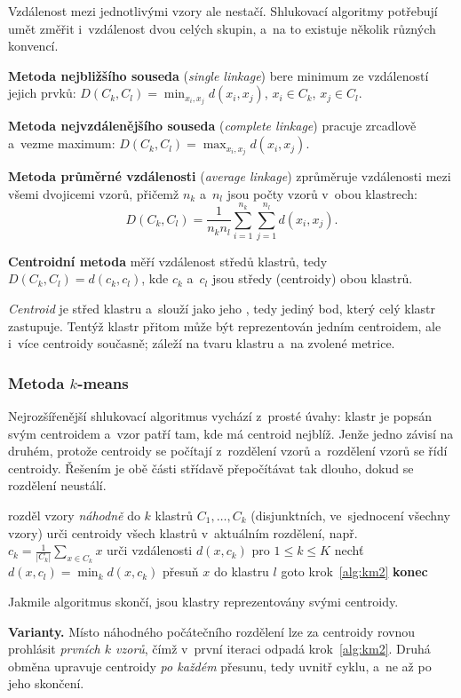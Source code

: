 \documentclass[11pt,a4paper]{article}
\theoremstyle{definition}
\begin{document}
Vzdálenost mezi jednotlivými vzory ale nestačí. Shlukovací algoritmy potřebují umět změřit
i~vzdálenost dvou celých skupin, a~na to existuje několik různých konvencí.

\begin{defbox}
\textbf{Metoda nejbližšího souseda} (\emph{single linkage}) bere minimum ze vzdáleností
jejich prvků:
$D(C_k,C_l)=\min_{x_i,x_j} d(x_i,x_j)$, $x_i\in C_k$, $x_j\in C_l$.

\textbf{Metoda nejvzdálenějšího souseda} (\emph{complete linkage}) pracuje zrcadlově
a~vezme maximum:
$D(C_k,C_l)=\max_{x_i,x_j} d(x_i,x_j)$.

\textbf{Metoda průměrné vzdálenosti} (\emph{average linkage}) zprůměruje vzdálenosti mezi
všemi dvojicemi vzorů, přičemž $n_k$ a~$n_l$ jsou počty vzorů v~obou klastrech:
\[ D(C_k,C_l)=\frac{1}{n_kn_l}\sum_{i=1}^{n_k}\sum_{j=1}^{n_l} d(x_i,x_j). \]

\textbf{Centroidní metoda} měří vzdálenost středů klastrů, tedy $D(C_k,C_l)=d(c_k,c_l)$, kde
$c_k$ a~$c_l$ jsou středy (centroidy) obou klastrů.
\end{defbox}

\emph{Centroid} je střed klastru a~slouží jako jeho , tedy jediný bod, který celý
klastr zastupuje. Tentýž klastr přitom může být reprezentován jedním centroidem, ale i~více
centroidy současně; záleží na tvaru klastru a~na zvolené metrice.

\subsubsection{Metoda $k$-means}

Nejrozšířenější shlukovací algoritmus vychází z~prosté úvahy: klastr je popsán svým
centroidem a~vzor patří tam, kde má centroid nejblíž. Jenže jedno závisí na druhém, protože
centroidy se počítají z~rozdělení vzorů a~rozdělení vzorů se řídí centroidy. Řešením je obě
části střídavě přepočítávat tak dlouho, dokud se rozdělení neustálí.

\begin{defbox}
\begin{algorithmic}[1]
\State rozděl vzory \emph{náhodně} do $k$ klastrů $C_1,\dots,C_k$ (disjunktních, ve~sjednocení
       všechny vzory)
\State \label{alg:km2} urči centroidy všech klastrů v~aktuálním rozdělení,
       např.\ $c_k=\frac{1}{|C_k|}\sum_{x\in C_k}x$
   \State urči vzdálenosti $d(x,c_k)$ pro $1\le k\le K$
   \State nechť $d(x,c_l)=\min_k d(x,c_k)$
    \State přesuň $x$ do klastru $l$ \EndIf
\EndFor
{} \State goto krok~\ref{alg:km2} \Else \State \textbf{konec} \EndIf
\end{algorithmic}
Jakmile algoritmus skončí, jsou klastry reprezentovány svými centroidy.

\textbf{Varianty.} Místo náhodného počátečního rozdělení lze za centroidy rovnou prohlásit
\emph{prvních $k$ vzorů}, čímž v~první iteraci odpadá krok~\ref{alg:km2}. Druhá obměna
upravuje centroidy \emph{po každém} přesunu, tedy uvnitř cyklu, a~ne až po jeho skončení.
\end{defbox}
\end{document}
